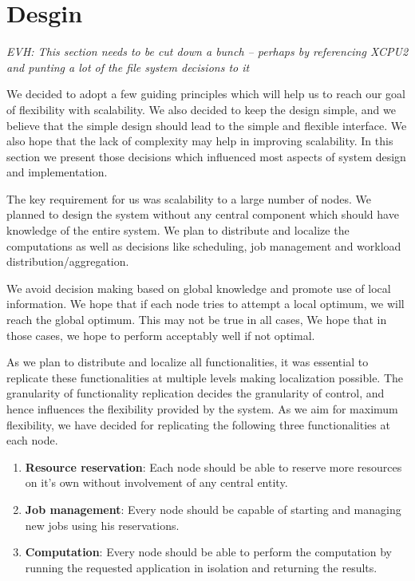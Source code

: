 \section{Desgin}
\emph{EVH: This section needs to be cut down a bunch -- perhaps by referencing XCPU2 and punting a lot of the file system decisions to it}

We decided to adopt a few guiding principles which will help us to reach our
goal of flexibility with scalability.  We also decided to keep the design simple,
and we believe that the simple design should lead to the simple and flexible
interface. We also hope that the lack of complexity may help in improving
scalability. In this section we present those decisions which influenced most
aspects of system design and implementation.

The key requirement for us was scalability to a large number of nodes.  We
planned to design the system without any central component which should have
knowledge of the entire system.  We plan to distribute and localize the
computations as well as decisions like scheduling, job management and
workload distribution/aggregation.

We avoid decision making based on global knowledge and promote use of local
information.  We hope that if each node tries to attempt a local optimum, we
will reach the global optimum.  This may not be true in all cases, We hope
that in those cases, we hope to perform acceptably well if not optimal.

As we plan to distribute and localize all functionalities, it was essential to
replicate these functionalities at multiple levels making localization
possible.  The granularity of functionality replication decides the granularity of control,
and hence influences the flexibility provided by the system.  As we aim for 
maximum flexibility, we have decided for replicating the following three
functionalities at each node.
\begin{enumerate}
\item \textbf{Resource reservation}: Each node should be able to reserve more
resources on it's own without involvement of any central entity.

\item \textbf{Job management}: Every node should be capable of starting and
managing new jobs using his reservations.

\item \textbf{Computation}: Every node should be able to perform the
computation by running the requested application in isolation and returning
the results.
\end{enumerate}

